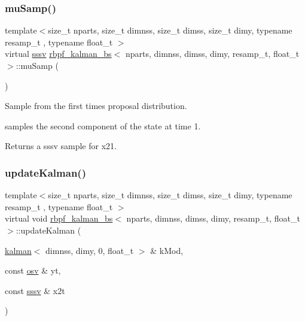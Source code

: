 \subsubsection{\texorpdfstring{mu\+Samp()}{muSamp()}}
{\footnotesize\ttfamily template$<$size\+\_\+t nparts, size\+\_\+t dimnss, size\+\_\+t dimss, size\+\_\+t dimy, typename resamp\+\_\+t , typename float\+\_\+t $>$ \\
virtual \hyperlink{classrbpf__kalman__bs_a2b40c9fa0d7a2ca42be3d0c43db0db8b}{sssv} \hyperlink{classrbpf__kalman__bs}{rbpf\+\_\+kalman\+\_\+bs}$<$ nparts, dimnss, dimss, dimy, resamp\+\_\+t, float\+\_\+t $>$\+::mu\+Samp (\begin{DoxyParamCaption}{ }\end{DoxyParamCaption})\hspace{0.3cm}{\ttfamily [pure virtual]}}



Sample from the first time\textquotesingle{}s proposal distribution. 

samples the second component of the state at time 1. \begin{DoxyReturn}{Returns}
a sssv sample for x21. 
\end{DoxyReturn}
\mbox{\label{classrbpf__kalman__bs_a3a382531f3af3856735ce031e34a5f54}} 
\subsubsection{\texorpdfstring{update\+Kalman()}{updateKalman()}}
{\footnotesize\ttfamily template$<$size\+\_\+t nparts, size\+\_\+t dimnss, size\+\_\+t dimss, size\+\_\+t dimy, typename resamp\+\_\+t , typename float\+\_\+t $>$ \\
virtual void \hyperlink{classrbpf__kalman__bs}{rbpf\+\_\+kalman\+\_\+bs}$<$ nparts, dimnss, dimss, dimy, resamp\+\_\+t, float\+\_\+t $>$\+::update\+Kalman (\begin{DoxyParamCaption}\item[{\hyperlink{classkalman}{kalman}$<$ dimnss, dimy, 0, float\+\_\+t $>$ \&}]{k\+Mod,  }\item[{const \hyperlink{classrbpf__kalman__bs_a51f159fe3b1d23742ba06d82d4724186}{osv} \&}]{yt,  }\item[{const \hyperlink{classrbpf__kalman__bs_a2b40c9fa0d7a2ca42be3d0c43db0db8b}{sssv} \&}]{x2t }\end{DoxyParamCaption})\hspace{0.3cm}{\ttfamily [pure virtual]}}



